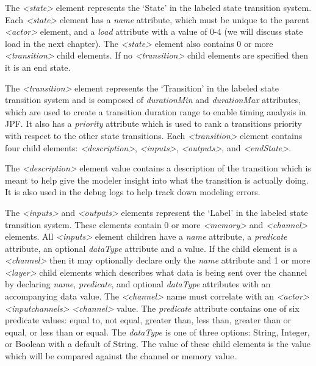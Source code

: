 The {\em \textless state\textgreater} element represents the `State' in the labeled state transition system.  Each {\em \textless state\textgreater} element has a {\em name} attribute, which must be unique to the parent {\em \textless actor\textgreater} element, and a {\em load} attribute with a value of 0-4 (we will discuss state load in the next chapter).  The {\em \textless state\textgreater} element also contains 0 or more {\em \textless transition\textgreater} child elements.  If no {\em \textless transition\textgreater} child elements are specified then it is an end state.  

The {\em \textless transition\textgreater} element represents the `Transition' in the labeled state transition system and is composed of {\em durationMin} and {\em durationMax} attributes, which are used to create a transition duration range to enable timing analysis in JPF.  It also has a {\em priority} attribute which is used to rank a transitions priority with respect to the other state transitions.  Each {\em \textless transition\textgreater} element contains four child elements: {\em \textless description\textgreater}, {\em \textless inputs\textgreater}, {\em \textless outputs\textgreater}, and {\em \textless endState\textgreater}.  

The {\em \textless description\textgreater} element value contains a description of the transition which is meant to help give the modeler insight into what the transition is actually doing.  It is also used in the debug logs to help track down modeling errors.  

The {\em \textless inputs\textgreater} and {\em \textless outputs\textgreater} elements represent the `Label' in the labeled state transition system.  These elements contain 0 or more {\em \textless memory\textgreater} and {\em \textless channel\textgreater} elements.  All {\em \textless inputs\textgreater} element children have a {\em name} attribute, a {\em predicate} attribute, an optional {\em dataType} attribute and a value.  If the child element is a {\em \textless channel\textgreater} then it may optionally declare only the {\em name} attribute and 1 or more {\em \textless layer\textgreater} child elements which describes what data is being sent over the channel by declaring {\em name}, {\em predicate}, and optional {\em dataType} attributes with an accompanying data value.  The {\em \textless channel\textgreater} name must correlate with an {\em \textless actor\textgreater} {\em \textless inputchannels\textgreater} {\em \textless channel\textgreater} value.  The {\em predicate} attribute contains one of six predicate values: equal to, not equal, greater than, less than, greater than or equal, or less than or equal.  The {\em dataType} is one of three options: String, Integer, or Boolean with a default of String.  The value of these child elements is the value which will be compared against the channel or memory value.  

